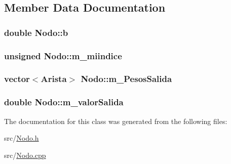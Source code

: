 \subsection{Member Data Documentation}
\hypertarget{classNodo_a3ba0471f16ed34bb96408bebe24f3149}{
\subsubsection[{b}]{\setlength{\rightskip}{0pt plus 5cm}double Nodo\-::b\hspace{0.3cm}{\ttfamily [private]}}}\label{classNodo_a3ba0471f16ed34bb96408bebe24f3149}
\hypertarget{classNodo_a433390fbd12030c7562f1601f3545a41}{
\subsubsection[{m\-\_\-miindice}]{\setlength{\rightskip}{0pt plus 5cm}unsigned Nodo\-::m\-\_\-miindice\hspace{0.3cm}{\ttfamily [private]}}}\label{classNodo_a433390fbd12030c7562f1601f3545a41}
\hypertarget{classNodo_af2f2e9e9ddebe2e969c76bbce0d3519f}{
\subsubsection[{m\-\_\-\-Pesos\-Salida}]{\setlength{\rightskip}{0pt plus 5cm}vector$<${\bf Arista}$>$ Nodo\-::m\-\_\-\-Pesos\-Salida\hspace{0.3cm}{\ttfamily [private]}}}\label{classNodo_af2f2e9e9ddebe2e969c76bbce0d3519f}
\hypertarget{classNodo_a64be78936e6cb237eadcf540ac7ca93d}{
\subsubsection[{m\-\_\-valor\-Salida}]{\setlength{\rightskip}{0pt plus 5cm}double Nodo\-::m\-\_\-valor\-Salida\hspace{0.3cm}{\ttfamily [private]}}}\label{classNodo_a64be78936e6cb237eadcf540ac7ca93d}


The documentation for this class was generated from the following files\-:\begin{DoxyCompactItemize}
\item 
src/\hyperlink{Nodo_8h}{Nodo.\-h}\item 
src/\hyperlink{Nodo_8cpp}{Nodo.\-cpp}\end{DoxyCompactItemize}
